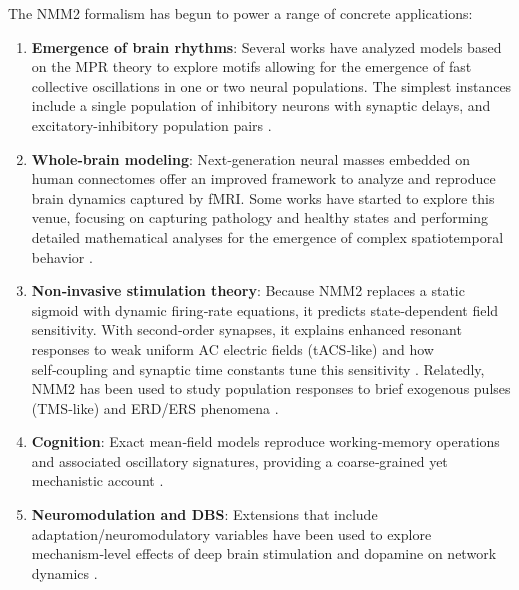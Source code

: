 \documentclass[12pt]{article}
\numberwithin{equation}{section}
\begin{document}
The NMM2 formalism has begun to power a range of concrete applications:
\begin{enumerate}
 \item \textbf{Emergence of brain rhythms}: Several works have analyzed models based on the MPR theory
 to explore motifs allowing for the emergence of fast collective oscillations in one or two neural populations. The simplest instances include a single population of inhibitory neurons with synaptic delays\cite{Devalle:2017aa,Dumont:2019aa,Bi2020,Clusella2023}, 
 and excitatory-inhibitory population pairs \cite{Dumont:2019aa,Byrne2020,segneri2020,ReynerParra2022,MayoraCebollero2025}.
\item  \textbf{Whole‑brain modeling}: Next‑generation neural masses embedded on human connectomes offer an improved framework to analyze and reproduce brain dynamics captured by fMRI. 
    Some works have started to explore this venue, focusing on capturing pathology and healthy states \cite{Gerster2021,Rabuffo2021,perl_whole-brain_2023,Forrester2024} and performing detailed mathematical analyses for the emergence of complex spatiotemporal behavior \cite{clusellaComplexSpatiotemporalOscillations2023,delicado-moll2026}.
 \item \textbf{Non‑invasive stimulation theory}: Because NMM2 replaces a static sigmoid with dynamic firing‑rate equations, it predicts state‑dependent field sensitivity. With second‑order synapses, it explains enhanced resonant responses to weak uniform AC electric fields (tACS‑like) and how self‑coupling and synaptic time constants tune this sensitivity \cite{Clusella2023}. Relatedly, NMM2 has been used to study population responses to brief exogenous pulses (TMS‑like) and ERD/ERS phenomena \cite{Byrne2020,Byrne2022}.
\item \textbf{Cognition}: Exact mean‑field models reproduce working‑memory operations and associated oscillatory signatures, providing a coarse‑grained yet mechanistic account \cite{Schmidt2018,Taher2020}.
\item \textbf{Neuromodulation and DBS}: Extensions that include adaptation/neuromodulatory variables have been used to explore mechanism‑level effects of deep brain stimulation and dopamine on network dynamics \cite{Depannemaecker2024,Chen2022}.
\end{enumerate}
\end{document}
